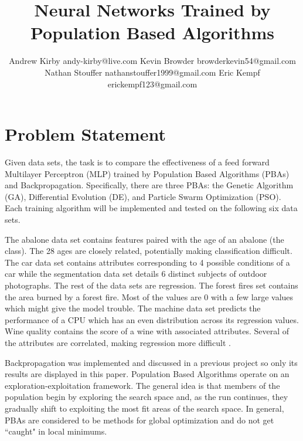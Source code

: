 \documentclass[twoside,11pt]{article}
\begin{document}
\title{Neural Networks Trained by Population Based Algorithms}

\author{\name Andrew Kirby \email andy-kirby@live.com \AND
		\name Kevin Browder \email browderkevin54@gmail.com \AND
		\name Nathan Stouffer \email nathanstouffer1999@gmail.com \AND
		\name Eric Kempf \email erickempf123@gmail.com }

\maketitle

\begin{abstract}

\end{abstract}

\section{Problem Statement}

	Given data sets, the task is to compare the effectiveness of a feed forward Multilayer Perceptron (MLP) trained by Population Based Algorithms (PBAs) and Backpropagation. Specifically, there are three PBAs: the Genetic Algorithm (GA), Differential Evolution (DE), and Particle Swarm Optimization (PSO).
	Each training algorithm will be implemented and tested on the following six data sets.

	The abalone data set contains features paired with the age of an abalone (the class). The 28 ages are closely related, potentially making classification difficult.
	The car data set contains attributes corresponding to 4 possible conditions of a car while the segmentation data set details 6 distinct subjects of outdoor photographs.
	The rest of the data sets are regression.
	The forest fires set contains the area burned by a forest fire. Most of the values are 0 with a few large values which might give the model trouble.
	The machine data set predicts the performance of a CPU which has an even distribution across its regression values.
	Wine quality contains the score of a wine with associated attributes. Several of the attributes are correlated, making regression more difficult \citep{datasets}.

	Backpropagation was implemented and discussed in a previous project so only its results are displayed in this paper. Population Based Algorithms operate on an exploration-exploitation framework.
	The general idea is that members of the population begin by exploring the search space and, as the run continues, they gradually shift to exploiting the most fit areas of the search space. In general, PBAs are considered to be methods for global optimization and do not get ``caught" in local minimums.
\end{document}
